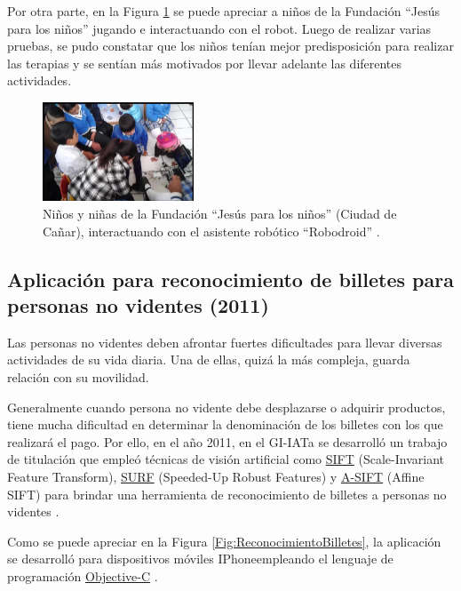 \documentclass[a4paper,10pt]{article}
\begin{document}
Por otra parte, en la Figura \ref{Fig:RobodroidTerapia} se puede apreciar a niños de la Fundación ``Jesús para los  niños'' jugando e interactuando con el robot. Luego de realizar varias pruebas, se pudo constatar que los niños tenían mejor predisposición para realizar las terapias y se sentían más motivados por llevar adelante las diferentes actividades.

\begin{figure}[th!]
	\centering
	\includegraphics[width = 0.4\textwidth]{images/Robodroid1.png}
	\caption{Niños y niñas de la Fundación ``Jesús para los niños''  (Ciudad de Cañar), interactuando con el asistente robótico ``Robodroid'' \cite{ochoa2014diseno}.}
	\label{Fig:RobodroidTerapia}
\end{figure}


\subsection{Aplicación para reconocimiento de billetes para personas no videntes (2011)}

Las personas no videntes deben afrontar fuertes dificultades para llevar diversas actividades de su vida diaria. Una de ellas, quizá la más compleja, guarda relación con su movilidad.

Generalmente cuando persona no vidente debe desplazarse o adquirir productos, tiene mucha dificultad en determinar la denominación de los billetes con los que realizará el pago. Por ello, en el año 2011, en el GI-IATa se desarrolló un trabajo de titulación que empleó técnicas de visión artificial como \href{https://opencv-python-tutroals.readthedocs.io/en/latest/py_tutorials/py_feature2d/py_sift_intro/py_sift_intro.html}{SIFT} (Scale-Invariant Feature Transform), \href{https://docs.opencv.org/3.0-beta/doc/py_tutorials/py_feature2d/py_surf_intro/py_surf_intro.html}{SURF} (Speeded-Up Robust Features) y \href{https://github.com/opencv/opencv/blob/master/samples/python/asift.py}{A-SIFT} (Affine SIFT) para brindar una herramienta de reconocimiento de billetes a personas no videntes \cite{plaza2011estudio}.

Como se puede apreciar en la Figura \ref{Fig:ReconocimientoBilletes}, la aplicación se desarrolló para dispositivos móviles IPhone\textregistered empleando el lenguaje de programación \href{https://developer.apple.com/library/archive/documentation/Cocoa/Conceptual/ProgrammingWithObjectiveC/Introduction/Introduction.html}{Objective-C} \cite{plaza2011estudio}.
\end{document}
